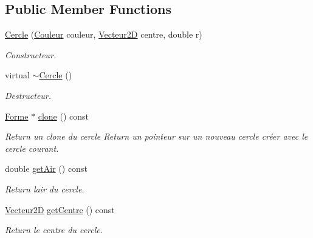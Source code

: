 \subsection*{Public Member Functions}
\begin{DoxyCompactItemize}
\item 
\mbox{\hyperlink{class_cercle_a581cf3e50c4c61f98260340a7e30903f}{Cercle}} (\mbox{\hyperlink{class_couleur}{Couleur}} couleur, \mbox{\hyperlink{class_vecteur2_d}{Vecteur2D}} centre, double r)
\begin{DoxyCompactList}\small\item\em Constructeur. \end{DoxyCompactList}\item 
\mbox{\label{class_cercle_a8749eabc689e99c4739b332712791997}} 
virtual \mbox{\hyperlink{class_cercle_a8749eabc689e99c4739b332712791997}{$\sim$\+Cercle}} ()
\begin{DoxyCompactList}\small\item\em Destructeur. \end{DoxyCompactList}\item 
\mbox{\label{class_cercle_aa644716a1b2c435a6d64a7fdbcf9b987}} 
\mbox{\hyperlink{class_forme}{Forme}} $\ast$ \mbox{\hyperlink{class_cercle_aa644716a1b2c435a6d64a7fdbcf9b987}{clone}} () const
\begin{DoxyCompactList}\small\item\em Return un clone du cercle Return un pointeur sur un nouveau cercle créer avec le cercle courant. \end{DoxyCompactList}\item 
\mbox{\label{class_cercle_aae89902987377c17a3488043ccd8adf5}} 
double \mbox{\hyperlink{class_cercle_aae89902987377c17a3488043ccd8adf5}{get\+Air}} () const
\begin{DoxyCompactList}\small\item\em Return l\textquotesingle{}air du cercle. \end{DoxyCompactList}\item 
\mbox{\label{class_cercle_afbf26df611767f7b1cc22904fd844932}} 
\mbox{\hyperlink{class_vecteur2_d}{Vecteur2D}} \mbox{\hyperlink{class_cercle_afbf26df611767f7b1cc22904fd844932}{get\+Centre}} () const
\begin{DoxyCompactList}\small\item\em Return le centre du cercle. \end{DoxyCompactList}\item 

\end{DoxyCompactItemize}
